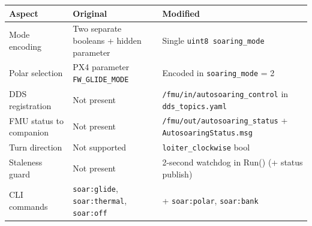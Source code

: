 \documentclass[12pt,a4paper]{article}
\begin{document}
\begin{center}
\begin{tabular}{p{4cm}p{5cm}p{5cm}}
\toprule
Aspect & Original & Modified \\
\midrule
Mode encoding & Two separate booleans + hidden parameter & Single \texttt{uint8 soaring\_mode} \\
Polar selection & PX4 parameter \texttt{FW\_GLIDE\_MODE} & Encoded in \texttt{soaring\_mode} = 2 \\
DDS registration & Not present & \texttt{/fmu/in/autosoaring\_control} in \texttt{dds\_topics.yaml} \\
FMU status to companion & Not present & \texttt{/fmu/out/autosoaring\_status} + \texttt{AutosoaringStatus.msg} \\
Turn direction & Not supported & \texttt{loiter\_clockwise} bool \\
Staleness guard & Not present & 2-second watchdog in Run() (+ status publish) \\
CLI commands & \texttt{soar:glide}, \texttt{soar:thermal}, \texttt{soar:off} & + \texttt{soar:polar}, \texttt{soar:bank} \\
\bottomrule
\end{tabular}
\end{center}
\end{document}
